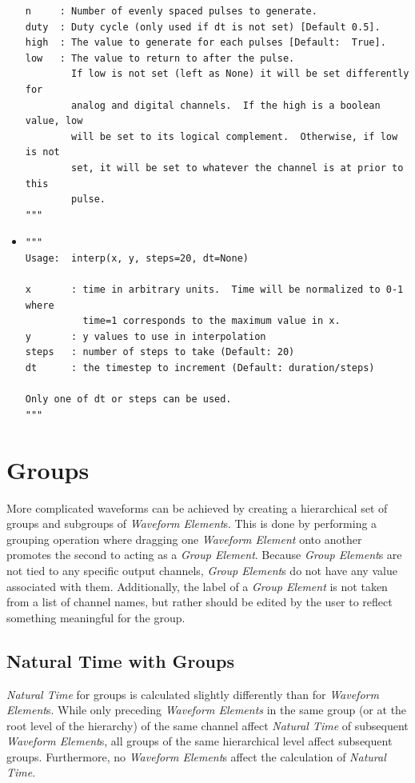\begin{itemize}
\begin{lstlisting}
n     : Number of evenly spaced pulses to generate.
duty  : Duty cycle (only used if dt is not set) [Default 0.5].
high  : The value to generate for each pulses [Default:  True].
low   : The value to return to after the pulse.
        If low is not set (left as None) it will be set differently for
        analog and digital channels.  If the high is a boolean value, low
        will be set to its logical complement.  Otherwise, if low is not
        set, it will be set to whatever the channel is at prior to this
        pulse.
"""
\end{lstlisting}

\item {}
\begin{lstlisting}
"""
Usage:  interp(x, y, steps=20, dt=None)

x       : time in arbitrary units.  Time will be normalized to 0-1 where
          time=1 corresponds to the maximum value in x.
y       : y values to use in interpolation
steps   : number of steps to take (Default: 20)
dt      : the timestep to increment (Default: duration/steps)

Only one of dt or steps can be used.
"""
\end{lstlisting}
\end{itemize}


\section{Groups}\label{sec:waveforms:groups}

More complicated waveforms can be achieved by creating a hierarchical set of
groups and subgroups of \textit{Waveform Element}s.  This is done by performing
a grouping operation where dragging one \textit{Waveform Element} onto another
promotes the second to acting as a \textit{Group Element}.  Because
\textit{Group Element}s are not tied to any specific output channels,
\textit{Group Element}s do not have any value associated with them.
Additionally, the label of a \textit{Group Element} is not taken from a list of
channel names, but rather should be edited by the user to reflect something
meaningful for the group.

\subsection{Natural Time with Groups}
\textit{Natural Time} for groups is calculated slightly differently than for
\textit{Waveform Element}s.  While only preceding \textit{Waveform Elements} in
the same group (or at the root level of the hierarchy) of the same channel
affect \textit{Natural Time} of subsequent \textit{Waveform Element}s, all groups of
the same hierarchical level affect subsequent groups.  Furthermore, no
\textit{Waveform Element}s affect the calculation of \textit{Natural Time}.

